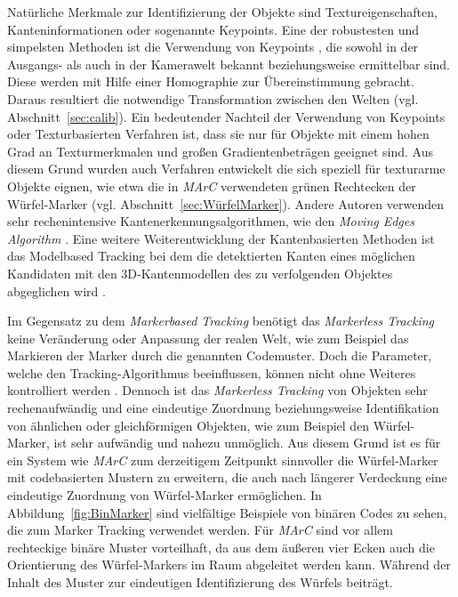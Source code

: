 Natürliche Merkmale zur Identifizierung der Objekte sind Textureigenschaften, Kanteninformationen oder sogenannte Keypoints. Eine der robustesten und simpelsten Methoden ist die Verwendung von Keypoints \cite{article:MarkerLessBarandiaran2010}\cite{article:MarkerLessWagner:}\cite{article:MarkerLessComport}\cite{article:MarkerLessLowe}, die sowohl in der Ausgangs- als auch in der Kamerawelt bekannt beziehungsweise ermittelbar sind. Diese werden mit Hilfe einer Homographie zur Übereinstimmung gebracht. Daraus resultiert die notwendige Transformation zwischen den Welten (vgl. Abschnitt~\ref{sec:calib}). Ein bedeutender Nachteil der Verwendung von Keypoints oder Texturbasierten Verfahren ist, dass sie nur für Objekte mit einem hohen Grad an Texturmerkmalen und großen Gradientenbeträgen geeignet sind. Aus diesem Grund wurden auch Verfahren \cite{article:MarkerLessStrucktHinterstoisser}\cite{article:MarkerLessStrucktDamen}\cite{article:MarkerLessStrucktPark} entwickelt die sich speziell für texturarme Objekte eignen, wie etwa die in \textit{MArC} verwendeten grünen Rechtecken der Würfel-Marker (vgl. Abschnitt~\ref{sec:WürfelMarker}). Andere Autoren verwenden sehr rechenintensive Kantenerkennungsalgorithmen, wie den \textit{Moving Edges Algorithm} \cite{article:MarkerLessEdgeMarchand}. Eine weitere Weiterentwicklung der Kantenbasierten Methoden ist das Modelbased Tracking bei dem die detektierten Kanten eines möglichen Kandidaten mit den 3D-Kantenmodellen des zu verfolgenden Objektes abgeglichen wird \cite{article:MarkerLessModellVacchetti}\cite{article:MarkerLessEdgeAlvarez}\cite{article:MarkerLessEdgeWu}\cite{article:MarkerLessBlasko}.

Im Gegensatz zu dem \textit{Markerbased Tracking} benötigt das \textit{Markerless Tracking} keine Veränderung oder Anpassung der realen Welt, wie zum Beispiel das Markieren der Marker durch die genannten Codemuster. Doch die Parameter, welche den Tracking-Algorithmus beeinflussen, können nicht ohne Weiteres kontrolliert werden \cite{article:MarkerLessBarandiaran2010}. Dennoch ist das \textit{Markerless Tracking} von Objekten sehr rechenaufwändig und eine eindeutige Zuordnung beziehungsweise Identifikation von ähnlichen oder gleichförmigen Objekten, wie zum Beispiel den Würfel-Marker, ist sehr aufwändig und nahezu unmöglich. Aus diesem Grund ist es für ein System wie \textit{MArC} zum derzeitigem Zeitpunkt sinnvoller die Würfel-Marker mit codebasierten Mustern zu erweitern, die auch nach längerer Verdeckung eine eindeutige Zuordnung von Würfel-Marker ermöglichen. In Abbildung~\ref{fig:BinMarker} sind vielfältige Beispiele von binären Codes zu sehen, die zum Marker Tracking verwendet werden. Für \textit{MArC} sind vor allem rechteckige binäre Muster vorteilhaft, da aus dem äußeren vier Ecken auch die Orientierung des Würfel-Markers im Raum abgeleitet werden kann. Während der Inhalt des Muster zur eindeutigen Identifizierung des Würfels beiträgt. 

